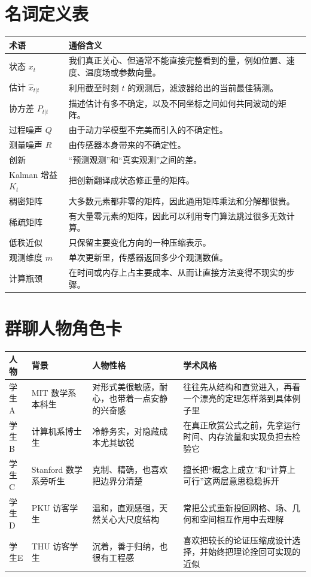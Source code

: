 \documentclass[12pt,a4paper]{ctexart}
\begin{document}
\appendix

\section{名词定义表}\label{app:glossary}

\begin{longtable}{>{\raggedright\arraybackslash}p{3.2cm} >{\raggedright\arraybackslash}p{10.2cm}}
\toprule
术语 & 通俗含义 \\
\midrule
\endhead
状态 \(x_t\) & 我们真正关心、但通常不能直接完整看到的量，例如位置、速度、温度场或参数向量。 \\
估计 \(\hat{x}_{t|t}\) & 利用截至时刻 \(t\) 的观测后，滤波器给出的当前最佳猜测。 \\
协方差 \(P_{t|t}\) & 描述估计有多不确定，以及不同坐标之间如何共同波动的矩阵。 \\
过程噪声 \(Q\) & 由于动力学模型不完美而引入的不确定性。 \\
测量噪声 \(R\) & 由传感器本身带来的不确定性。 \\
创新 & “预测观测”和“真实观测”之间的差。 \\
Kalman 增益 \(K_t\) & 把创新翻译成状态修正量的矩阵。 \\
稠密矩阵 & 大多数元素都非零的矩阵，因此通用矩阵乘法和分解都很贵。 \\
稀疏矩阵 & 有大量零元素的矩阵，因此可以利用专门算法跳过很多无效计算。 \\
低秩近似 & 只保留主要变化方向的一种压缩表示。 \\
观测维度 \(m\) & 单次更新里，传感器返回多少个观测数值。 \\
计算瓶颈 & 在时间或内存上占主要成本、从而让直接方法变得不现实的步骤。 \\
\bottomrule
\end{longtable}

\section{群聊人物角色卡}\label{app:role-cards}

\begin{longtable}{>{\raggedright\arraybackslash}p{2.1cm} >{\raggedright\arraybackslash}p{4.2cm} >{\raggedright\arraybackslash}p{3.2cm} >{\raggedright\arraybackslash}p{4.1cm}}
\toprule
人物 & 背景 & 人物性格 & 学术风格 \\
\midrule
\endhead
学生A & MIT 数学系本科生 & 对形式美很敏感，耐心，也带着一点安静的兴奋感 & 往往先从结构和直觉进入，再看一个漂亮的定理怎样落到具体例子里 \\
学生B & 计算机系博士生 & 冷静务实，对隐藏成本尤其敏锐 & 在真正欣赏公式之前，先拿运行时间、内存流量和实现负担去检验它 \\
学生C & Stanford 数学系旁听生 & 克制、精确，也喜欢把边界分清楚 & 擅长把“概念上成立”和“计算上可行”这两层意思稳稳拆开 \\
学生D & PKU 访客学生 & 温和，直观感强，天然关心大尺度结构 & 常把公式重新投回网格、场、几何和空间相互作用中去理解 \\
学生E & THU 访客学生 & 沉着，善于归纳，也很有工程感 & 喜欢把较长的论证压缩成设计选择，并始终把理论拴回可实现的近似 \\
\bottomrule
\end{longtable}
\end{document}
